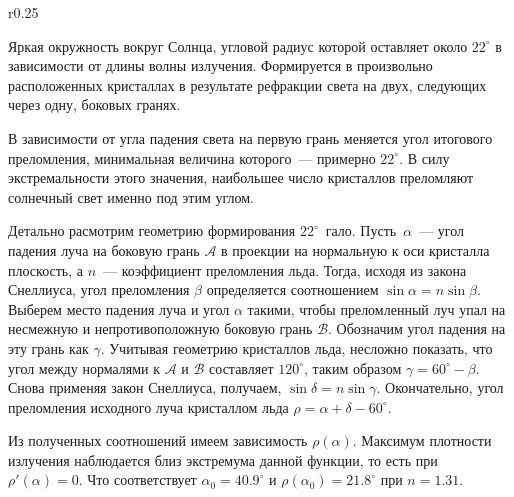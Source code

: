 \begin{wrapfigure}[11]{r}{0.25\tw}
    \caption{}
    \label{pic:22-galo-scheme}
\end{wrapfigure}
Яркая окружность вокруг Солнца, угловой радиус которой оставляет около $22^\circ$ в зависимости от длины волны излучения. Формируется в произвольно расположенных кристаллах в результате рефракции света на двух, следующих через одну, боковых гранях.

В зависимости от угла падения света на первую грань меняется угол итогового преломления, минимальная величина которого~--- примерно $22^\circ$. В силу экстремальности этого значения, наибольшее число кристаллов преломляют солнечный свет именно под этим углом.

Детально расмотрим геометрию формирования $22^\circ$~гало. Пусть~$\alpha$~--- угол падения луча на боковую грань $\mathcal{A}$ в проекции на нормальную к оси кристалла плоскость, а $n$~--- коэффициент преломления льда. Тогда, исходя из закона Снеллиуса, угол преломления $\beta$ определяется соотношением $\sin \alpha = n \sin \beta$. Выберем место падения луча и угол $\alpha$ такими, чтобы преломленный луч упал на несмежную и непротивоположную боковую грань $\mathcal{B}$. Обозначим угол падения на эту грань как $\gamma$. Учитывая геометрию кристаллов льда, несложно показать, что угол между нормалями к $\mathcal{A}$ и $\mathcal{B}$ составляет $120^\circ$, таким образом $\gamma = 60^\circ - \beta$. Снова применяя закон Снеллиуса, получаем, $\sin \delta = n \sin \gamma$. Окончательно, угол преломления исходного луча кристаллом льда $\rho =  \alpha + \delta - 60^\circ$.

Из полученных соотношений имеем зависимость $\rho(\alpha)$. Максимум плотности излучения наблюдается близ экстремума данной функции, то есть при $\rho'(\alpha) = 0$. Что соответствует $\alpha_0 = 40.9^\circ$ и $\rho(\alpha_0) = 21.8^\circ$ при $n=1.31$.
